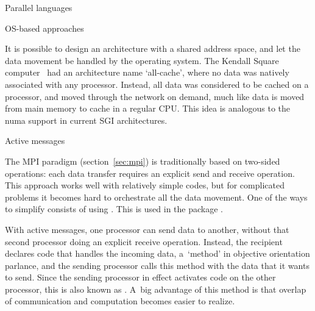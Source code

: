 
 {Parallel languages}
\label{sec:pgas}


 {OS-based approaches}

It is possible to design an architecture with a shared address space,
and let the data movement be handled by the operating system. The
Kendall Square computer~\cite{KSRallcache} had an architecture name
`all-cache', where no data was natively associated with any
processor. Instead, all data was considered to be cached on a
processor, and moved through the network on demand, much like data is
moved from main memory to cache in a regular CPU. This idea 
is analogous to the numa support in current SGI architectures.

 {Active messages}
\label{sec:charm++}

The MPI paradigm (section~\ref{sec:mpi}) is traditionally based on
two-sided operations: each data transfer requires an explicit send and
receive operation. This approach works well with relatively simple
codes, but for complicated problems it becomes hard to orchestrate all
the data movement. One of the ways to simplify consists of using
. This is used in the package
\cite{charmpp}.

With active messages, one processor can send data to another, without
that second processor doing an explicit receive operation. Instead,
the recipient declares code that handles the incoming data, a~`method'
in objective orientation parlance, and the sending processor calls
this method with the data that it wants to send. Since the sending
processor in effect activates code on the other processor, this is
also known as . A~big advantage of
this method is that overlap of communication and computation becomes
easier to realize.

